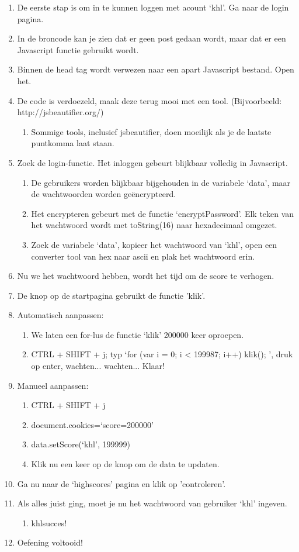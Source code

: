 \begin{enumerate}
  \item De eerste stap is om in te kunnen loggen met acount `khl'. Ga naar de login pagina.
  \item In de broncode kan je zien dat er geen post gedaan wordt, maar dat er een Javascript functie gebruikt wordt.
  \item Binnen de head tag wordt verwezen naar een apart Javascript bestand. Open het.
  \item De code is verdoezeld, maak deze terug mooi met een tool. (Bijvoorbeeld: http://jsbeautifier.org/)
   \begin{enumerate}
   \item Sommige tools, inclusief jsbeautifier, doen moeilijk als je de laatste puntkomma laat staan.
   \end{enumerate}
  \item Zoek de login-functie. Het inloggen gebeurt blijkbaar volledig in Javascript.
   \begin{enumerate}
   \item De gebruikers worden blijkbaar bijgehouden in de variabele `data', maar de wachtwoorden worden geëncrypteerd.
   \item Het encrypteren gebeurt met de functie `encryptPassword'. Elk teken van het wachtwoord wordt met toString(16) naar hexadecimaal omgezet.
\item Zoek de variabele `data', kopieer het wachtwoord van `khl', open een converter tool van hex naar ascii en plak het wachtwoord erin.
   \end{enumerate}
  \item Nu we het wachtwoord hebben, wordt het tijd om de score te verhogen.
  \item De knop op de startpagina gebruikt de functie 'klik'.
  \item Automatisch aanpassen:
  \begin{enumerate}
  \item We laten een for-lus de functie `klik' 200000 keer oproepen.
  \item CTRL + SHIFT + j; typ `for (var i = 0; i < 199987; i++) { klik(); }', druk op enter, wachten... wachten... Klaar!
   \end{enumerate}
  \item Manueel aanpassen:
   \begin{enumerate}
   \item CTRL + SHIFT + j
   \item document.cookies=`score=200000'
   \item data.setScore(`khl', 199999)
   \item Klik nu een keer op de knop om de data te updaten.
   \end{enumerate}
  \item Ga nu naar de `highscores' pagina en klik op 'controleren'.
  \item Als alles juist ging, moet je nu het wachtwoord van gebruiker `khl' ingeven.
     \begin{enumerate}
  \item khlsucces!
  \end{enumerate}
  \item Oefening voltooid!
\end{enumerate}